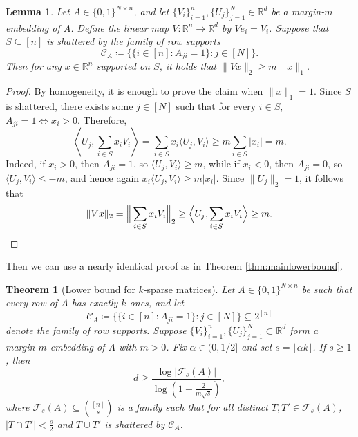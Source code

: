 \documentclass[preprint]{article}
\newtheorem{theorem}{Theorem}[section]
\newtheorem{lemma}{Lemma}[]
\begin{document}
\begin{lemma}\label{lem:reductiontoVCdimension}
Let $A\in \{0,1\}^{N\times n}$, and let $\{V_i\}_{i=1}^n,\{U_j\}_{j=1}^N \in \mathbb{R}^d$ be a margin-$m$ embedding of $A$. Define the linear map $V:\mathbb{R}^n\to \mathbb{R}^d$ by $Ve_i=V_i$. Suppose that $S\subseteq [n]$ is shattered by the family of row supports
\[
\mathcal{C}_A \coloneqq \bigl\{\{i\in[n]:A_{ji}=1\}:j\in[N]\bigr\}.
\]
Then for any $x\in \mathbb{R}^n$ supported on $S$, it holds that $\|Vx\|_2 \ge m\|x\|_1$.
\end{lemma}

\begin{proof}
By homogeneity, it is enough to prove the claim when $\|x\|_1=1$. Since $S$ is shattered, there exists some $j\in [N]$ such that for every $i\in S$, $A_{ji}=1 \iff x_i>0$. Therefore,
$$
\left\langle U_j,\sum_{i\in S}x_iV_i\right\rangle
=
\sum_{i\in S}x_i\langle U_j,V_i\rangle
\ge
m\sum_{i\in S}|x_i|
=
m.
$$
Indeed, if $x_i>0$, then $A_{ji}=1$, so $\langle U_j,V_i\rangle\ge m$, while if $x_i<0$, then $A_{ji}=0$, so $\langle U_j,V_i\rangle\le -m$, and hence again $x_i\langle U_j,V_i\rangle \ge m|x_i|$. Since $\|U_j\|_2=1$, it follows that
$$
\|Vx\|_2
=
\Big\|\sum_{i\in S}x_iV_i\Big\|_2
\ge
\Big\langle U_j,\sum_{i\in S}x_iV_i\Big\rangle
\ge m.\qedhere
$$
\end{proof}


Then we can use a nearly identical proof as in Theorem \ref{thm:mainlowerbound}.


\begin{theorem}[Lower bound for $k$-sparse matrices]\label{rem:ksparsegeneralization}
Let $A\in\{0,1\}^{N\times n}$ be such that every row of $A$ has exactly $k$ ones, and let
$$\mathcal{C}_A \coloneqq \bigl\{\{i\in[n]:A_{ji}=1\}: j\in[N]\bigr\}\subseteq 2^{[n]}
$$
denote the family of row supports. Suppose $\{V_i\}_{i=1}^n,\{U_j\}_{j=1}^N\subset\mathbb{R}^d$ form a margin-$m$ embedding of $A$ with $m > 0$. Fix $\alpha\in(0,1/2]$ and set $s=\lfloor \alpha k\rfloor$. If $s\ge 1$, then
$$
d \ge \frac{\log |\mathcal{F}_s(A)|}{\log\!\left(1+\frac{2}{m\sqrt{s}}\right)},
$$
where $\mathcal{F}_s(A)\subseteq \binom{[n]}{s}$ is a family such that for all distinct $T,T'\in\mathcal{F}_s(A)$, $|T\cap T'|<\frac{s}{2}$ and $T\cup T'$ is shattered by $\mathcal{C}_A$.
\end{theorem}
\end{document}
